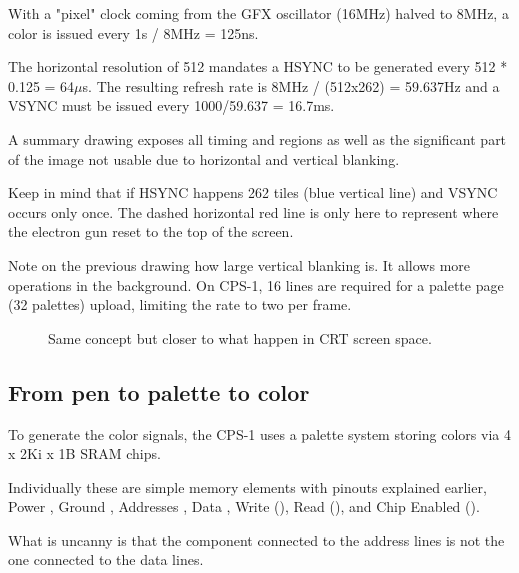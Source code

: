 With a "pixel" clock coming from the GFX oscillator (16MHz) halved to 8MHz, a color is issued every 1s / 8MHz = 125ns.

The horizontal resolution of 512 mandates a HSYNC to be generated every 512 * 0.125 = 64$\mu$s. The resulting refresh rate is 8MHz / (512x262) = 59.637Hz and a VSYNC must be issued every 1000/59.637 = 16.7ms.


A summary drawing exposes all timing and regions as well as the significant part of the image not usable due to horizontal and vertical blanking.






Keep in mind that if HSYNC happens 262 tiles (blue vertical line) and VSYNC occurs only once. The dashed horizontal red line is only here to represent where the electron gun reset to the top of the screen.

Note on the previous drawing how large vertical blanking is. It allows more operations in the background. On CPS-1, 16 lines are required for a palette page (32 palettes) upload, limiting the rate to two per frame.

\begin{figure}[H]
\caption*{Same concept but closer to what happen in CRT screen space.}
\end{figure}


\subsection{From pen to palette to color}

To generate the color signals, the CPS-1 uses a palette system storing colors via 4 x 2Ki x 1B  SRAM chips.


Individually these are simple memory elements with pinouts explained earlier, Power , Ground , Addresses , Data , Write (), Read (), and Chip Enabled ().

What is uncanny is that the component connected to the address lines is not the one connected to the data lines.

